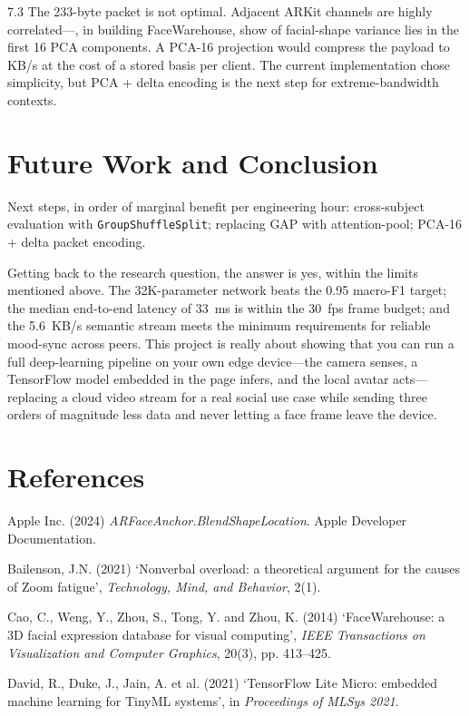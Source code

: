 \documentclass[11pt,a4paper]{article}
\begin{document}
7.3 The 233-byte packet is not optimal. Adjacent ARKit channels are highly correlated---, in building FaceWarehouse, show  of facial-shape variance lies in the first 16 PCA components. A PCA-16 projection would compress the payload  to  KB/s at the cost of a stored basis per client. The current implementation chose simplicity, but PCA + delta encoding is the next step for extreme-bandwidth contexts.

\section{Future Work and Conclusion}

Next steps, in order of marginal benefit per engineering hour: cross-subject evaluation with \texttt{GroupShuffleSplit}; replacing GAP with attention-pool; PCA-16 + delta packet encoding.

Getting back to the research question, the answer is yes, within the limits mentioned above. The 32K-parameter network beats the 0.95 macro-F1 target; the median end-to-end latency of 33~ms is within the 30~fps frame budget; and the 5.6~KB/s semantic stream meets the minimum requirements for reliable mood-sync across peers. This project is really about showing that you can run a full deep-learning pipeline on your own edge device---the camera senses, a TensorFlow model embedded in the page infers, and the local avatar acts---replacing a cloud video stream for a real social use case while sending three orders of magnitude less data and never letting a face frame leave the device.

\section*{References}
\begingroup
\setlength{\parskip}{0.35em}
\small
Apple Inc. (2024) \emph{ARFaceAnchor.BlendShapeLocation}. Apple Developer Documentation.

Bailenson, J.N. (2021) `Nonverbal overload: a theoretical argument for the causes of Zoom fatigue', \emph{Technology, Mind, and Behavior}, 2(1).

Cao, C., Weng, Y., Zhou, S., Tong, Y. and Zhou, K. (2014) `FaceWarehouse: a 3D facial expression database for visual computing', \emph{IEEE Transactions on Visualization and Computer Graphics}, 20(3), pp. 413--425.

David, R., Duke, J., Jain, A. et al. (2021) `TensorFlow Lite Micro: embedded machine learning for TinyML systems', in \emph{Proceedings of MLSys 2021}.
\end{document}
